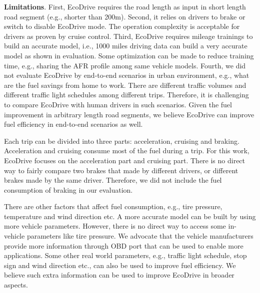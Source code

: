 \textbf{Limitations}. 
First, EcoDrive requires the road length as input in short length road segment 
(e.g., shorter than 200m). 
Second, it relies on drivers to brake or switch to disable EcoDrive mode. 
The operation complexity is acceptable for drivers as proven
by cruise control.
Third, EcoDrive requires mileage trainings to build an accurate model, i.e., 
1000 miles driving data can build a very accurate model as shown in evaluation. 
Some optimization can be made to reduce training time, e.g., sharing the AFR profile 
among same vehicle models.
Fourth, we did not evaluate EcoDrive by end-to-end scenarios in urban environment, 
e.g., what are the fuel savings from home to work. 
There are different traffic volumes 
and different traffic light schedules among different trips. 
Therefore, it is challenging to compare EcoDrive with human drivers 
in such scenarios. 
Given the fuel improvement in arbitrary length road segments, 
we believe EcoDrive can improve fuel efficiency in end-to-end scenarios as well.   

Each trip can be divided into three parts: acceleration, cruising and braking. 
Acceleration and cruising consume most of the fuel during a trip. 
For this work, EcoDrive focuses on the acceleration part and cruising part. 
There is no direct way to fairly compare two brakes that made by different drivers, 
or different brakes made by the same driver. 
Therefore, we did not include the fuel consumption of braking in our evaluation. 

There are other factors that affect fuel consumption, e.g., 
tire pressure, temperature and wind direction etc. 
A more accurate model can be built by using more 
vehicle parameters. 
However, there is no direct way to access some in-vehicle parameters
like tire pressure. 
We advocate that the vehicle manufacturers provide more
information through OBD port that can be used to enable
more applications. 
Some other real world parameters, 
e.g., traffic light schedule, stop sign and wind direction etc., 
can also be used to improve fuel efficiency. 
We believe such extra information can be used to improve 
EcoDrive in broader aspects.


